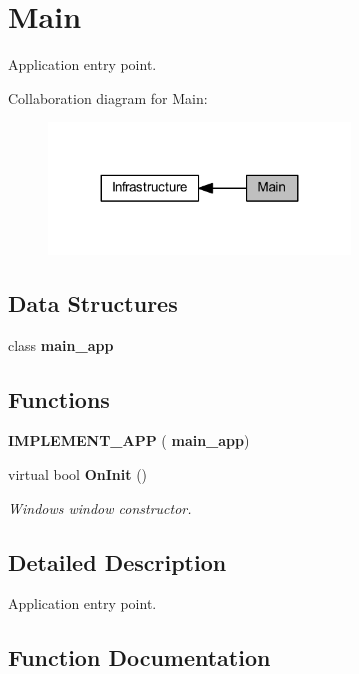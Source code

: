 \section{Main}
\label{group___main}


Application entry point.  


Collaboration diagram for Main\+:\nopagebreak
\begin{figure}[H]
\begin{center}
\leavevmode
\includegraphics[width=227pt]{group___main}
\end{center}
\end{figure}
\subsection*{Data Structures}
\begin{DoxyCompactItemize}
\item 
class \textbf{ main\+\_\+app}
\end{DoxyCompactItemize}
\subsection*{Functions}
\begin{DoxyCompactItemize}
\item 
\textbf{ I\+M\+P\+L\+E\+M\+E\+N\+T\+\_\+\+A\+PP} (\textbf{ main\+\_\+app})
\item 
virtual bool \textbf{ On\+Init} ()
\begin{DoxyCompactList}\small\item\em Windows window constructor. \end{DoxyCompactList}\end{DoxyCompactItemize}


\subsection{Detailed Description}
Application entry point. 



\subsection{Function Documentation}
\mbox{\label{group___main_gaebfea8791071ccc2c05f0891cde86213}} 
